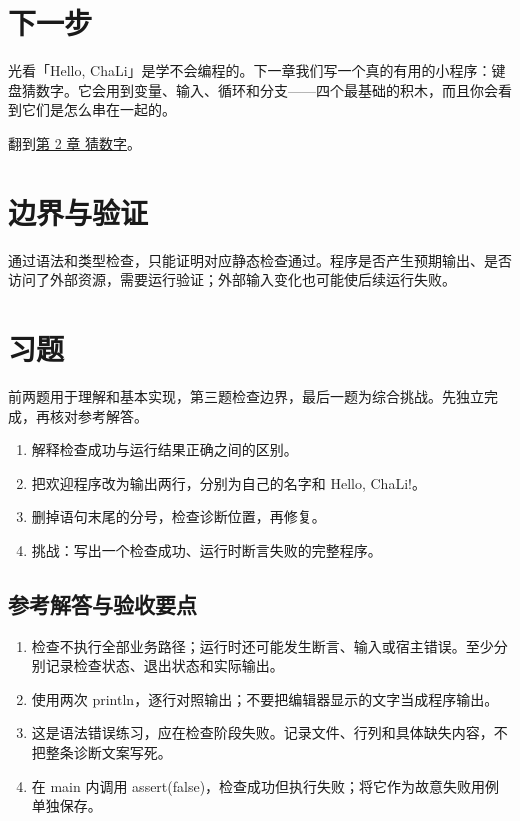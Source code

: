 \section{下一步}

光看「Hello, ChaLi」是学不会编程的。下一章我们写一个真的有用的小程序：键盘猜数字。它会用到变量、输入、循环和分支——四个最基础的积木，而且你会看到它们是怎么串在一起的。

翻到\hyperref[ch:02]{第 2 章 猜数字}。

\section{边界与验证}

通过语法和类型检查，只能证明对应静态检查通过。程序是否产生预期输出、是否访问了外部资源，需要运行验证；外部输入变化也可能使后续运行失败。

\section{习题}

前两题用于理解和基本实现，第三题检查边界，最后一题为综合挑战。先独立完成，再核对参考解答。

\begin{enumerate}

\item 解释检查成功与运行结果正确之间的区别。

\item 把欢迎程序改为输出两行，分别为自己的名字和 Hello, ChaLi!。

\item 删掉语句末尾的分号，检查诊断位置，再修复。

\item 挑战：写出一个检查成功、运行时断言失败的完整程序。

\end{enumerate}

\subsection*{参考解答与验收要点}

\begin{enumerate}

\item 检查不执行全部业务路径；运行时还可能发生断言、输入或宿主错误。至少分别记录检查状态、退出状态和实际输出。

\item 使用两次 println，逐行对照输出；不要把编辑器显示的文字当成程序输出。

\item 这是语法错误练习，应在检查阶段失败。记录文件、行列和具体缺失内容，不把整条诊断文案写死。

\item 在 main 内调用 assert(false)，检查成功但执行失败；将它作为故意失败用例单独保存。

\end{enumerate}

